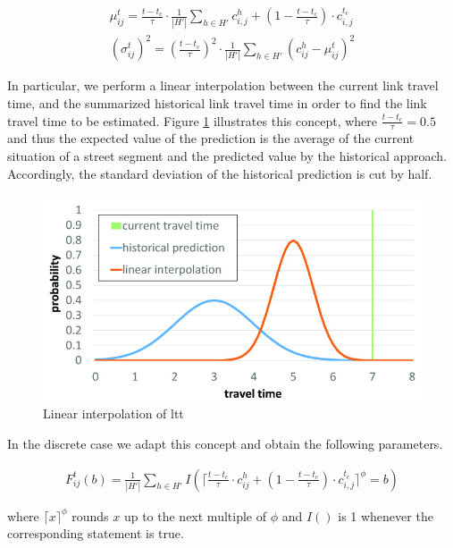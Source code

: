 \begin{gather}
	\mu_{ij}^t = \frac{t - t_c}{\tau}\cdot\frac{1}{|H'|}\sum_{h\in H'} c_{i,j}^h
	+ (1-\frac{t - t_c}{\tau})\cdot c_{i,j}^{t_c}\\
	(\sigma_{ij}^t)^2 = (\frac{t - t_c}{\tau})^2 \cdot \frac{1}{|H'|}\sum_{h\in H'}
	(c_{ij}^h-\mu_{ij}^t)^2
\end{gather}

In particular, we perform a linear interpolation between the current link
travel time, and the summarized historical link travel time in order to find the
link travel time to be estimated. Figure \ref{fig:interpolation} illustrates
this concept, where  $\frac{t - t_c}{\tau} = 0.5$ and thus the expected value of
the prediction is the average of the current situation of a street segment and
the predicted value by the historical approach. Accordingly, the standard
deviation of the historical prediction is cut by half.

 \begin{figure}[h]
    \centering
    \includegraphics[width=0.80\columnwidth]{figures/tt_interpolation.jpg}
    \caption{Linear interpolation of ltt}
    \label{fig:interpolation}
\end{figure}

In the discrete case we adapt this concept and
obtain the following parameters.

\begin{gather}
F_{ij}^t(b) = \frac{1}{|H'|}\sum_{h\in H'} I(\lceil\frac{t - t_c}{\tau} \cdot 
c_{ij}^h + (1-\frac{t - t_c}{\tau})\cdot c_{i,j}^{t_c}\rceil^\phi = b)
\end{gather}

where $\lceil x \rceil^\phi$ rounds $x$ up to the next multiple of $\phi$ and
$I()$ is 1 whenever the corresponding statement is true.

